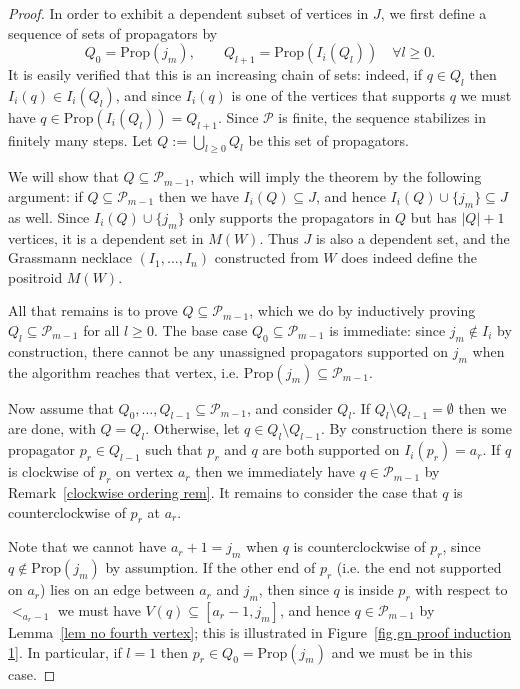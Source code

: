 \documentclass[11pt]{article}
\newcommand{\cP}{\mathcal{P}}
\newcommand{\Prop}{\textrm{Prop}}
\theoremstyle{remark}
\theoremstyle{definition}
\begin{document}
\begin{proof}
In order to exhibit a dependent subset of vertices in $J$, we first define a sequence of sets of propagators by
\[Q_0 = \Prop(j_m), \qquad Q_{l+1} = \Prop(I_i(Q_l))\quad \forall l \geq 0.\]
It is easily verified that this is an increasing chain of sets: indeed, if $q \in Q_l$ then $I_i(q) \in I_i(Q_l)$, and since $I_i(q)$ is one of the vertices that supports $q$ we must have $q \in \Prop(I_i(Q_l)) = Q_{l+1}$. Since $\cP$ is finite, the sequence stabilizes in finitely many steps. Let $Q := \bigcup_{l \geq 0} Q_l$ be this set of propagators.

We will show that $Q \subseteq \mathcal{P}_{m-1}$, which will imply the theorem by the following argument: if $Q \subseteq \cP_{m-1}$ then we have $I_i(Q)\subseteq J$, and hence $I_i(Q) \cup \{j_m\} \subseteq J$ as well. Since $I_i(Q) \cup \{j_m\}$ only supports the propagators in $Q$ but has $|Q|+1$ vertices, it is a dependent set in $M(W)$. Thus $J$ is also a dependent set, and the Grassmann necklace $(I_1,\dots,I_n)$ constructed from $W$ does indeed define the positroid $M(W)$.

All that remains is to prove $Q\subseteq \mathcal{P}_{m-1}$, which we do by inductively proving $Q_l \subseteq \mathcal{P}_{m-1}$ for all $l \geq 0$. The base case $Q_0 \subseteq \cP_{m-1}$ is immediate: since $j_m \not\in I_i$ by construction, there cannot be any unassigned propagators supported on $j_m$ when the algorithm reaches that vertex, i.e. ${\Prop(j_m) \subseteq \cP_{m-1}}$.

Now assume that $Q_0,\dots,Q_{l-1} \subseteq \cP_{m-1}$, and consider $Q_{l}$. If $Q_{l} \setminus Q_{l-1} = \emptyset$ then we are done, with $Q = Q_l$.  Otherwise, let $q \in Q_{l} \setminus Q_{l-1}$. By construction there is some propagator $p_r \in Q_{l-1}$ such that $p_r$ and $q$ are both supported on $I_i(p_r) = a_r$. If $q$ is clockwise of $p_r$ on vertex $a_r$ then we immediately have $q \in \cP_{m-1}$ by Remark~\ref{clockwise ordering rem}.  It remains to consider the case that $q$ is counterclockwise of $p_r$ at $a_r$.

Note that we cannot have $a_r+ 1 = j_m$ when $q$ is counterclockwise of $p_r$, since $q \not\in \Prop(j_m)$ by assumption. If the other end of $p_r$ (i.e. the end not supported on $a_r$) lies on an edge between $a_r$ and $j_m$, then since $q$ is inside $p_r$ with respect to $<_{a_r-1}$ we must have $V(q) \subseteq [a_r-1,j_m]$, and hence $q \in \cP_{m-1}$ by Lemma~\ref{lem no fourth vertex}; this is illustrated in Figure~\ref{fig gn proof induction 1}. In particular, if $l=1$ then $p_r \in Q_{0} = \Prop(j_m)$ and we must be in this case. 


\end{proof}
\end{document}
